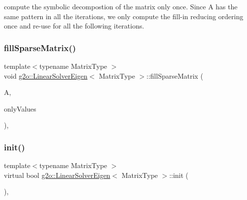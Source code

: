 compute the symbolic decompostion of the matrix only once. Since A has the same pattern in all the iterations, we only compute the fill-\/in reducing ordering once and re-\/use for all the following iterations. \mbox{\label{classg2o_1_1_linear_solver_eigen_a8ab862dc1eebb6ec5815f3970e9073f3}} 
\subsubsection{\texorpdfstring{fill\+Sparse\+Matrix()}{fillSparseMatrix()}}
{\footnotesize\ttfamily template$<$typename Matrix\+Type $>$ \\
void \mbox{\hyperlink{classg2o_1_1_linear_solver_eigen}{g2o\+::\+Linear\+Solver\+Eigen}}$<$ Matrix\+Type $>$\+::fill\+Sparse\+Matrix (\begin{DoxyParamCaption}\item[{const \mbox{\hyperlink{classg2o_1_1_sparse_block_matrix}{Sparse\+Block\+Matrix}}$<$ Matrix\+Type $>$ \&}]{A,  }\item[{bool}]{only\+Values }\end{DoxyParamCaption})\hspace{0.3cm}{\ttfamily [inline]}, {\ttfamily [protected]}}

\mbox{\label{classg2o_1_1_linear_solver_eigen_a8fca4bb987dcbeb94a366b1532dee139}} 
\subsubsection{\texorpdfstring{init()}{init()}}
{\footnotesize\ttfamily template$<$typename Matrix\+Type $>$ \\
virtual bool \mbox{\hyperlink{classg2o_1_1_linear_solver_eigen}{g2o\+::\+Linear\+Solver\+Eigen}}$<$ Matrix\+Type $>$\+::init (\begin{DoxyParamCaption}{ }\end{DoxyParamCaption})\hspace{0.3cm}{\ttfamily [inline]}, {\ttfamily [virtual]}}

